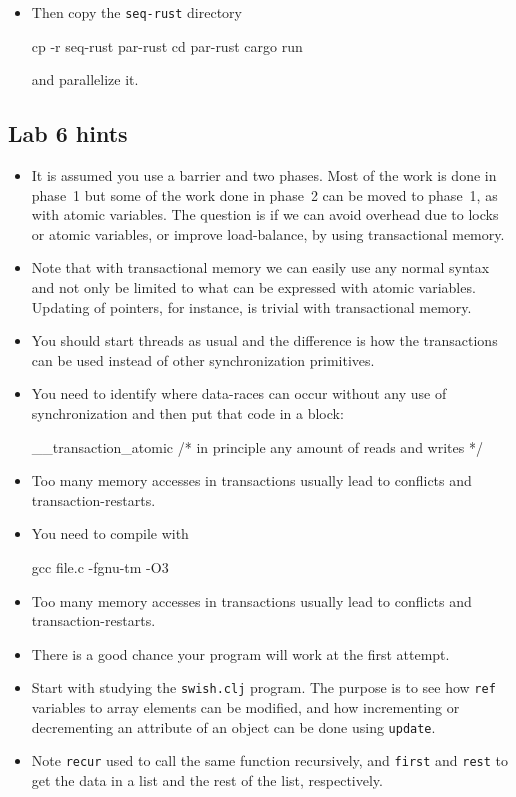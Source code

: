 \documentclass{forsete}
\begin{document}
{\begin{itemize}
\item Then copy the \verb.seq-rust. directory
\begin{ccode}
cp -r seq-rust par-rust
cd par-rust
cargo run
\end{ccode}
and parallelize it.

\end{itemize}

\subsection*{Lab 6 hints}
\begin{itemize}
\item It is assumed you use a barrier and two phases. Most of the work is done in phase~1 but some 
of the work done in phase~2 can be moved to phase~1, as with atomic variables. The question is
if we can avoid overhead due to locks or atomic variables, or improve load-balance, by using transactional memory.
\item Note that with transactional memory we can easily use any normal syntax and not only 
be limited to what can be expressed with atomic variables. Updating of pointers, for instance, is 
trivial with transactional memory.
\item You should start threads as usual and the difference is how the transactions can be used
instead of other synchronization primitives. 
\item You need to identify where data-races can occur without any use of synchronization and then
put that code in a block:
\begin{ccode}
__transaction_atomic {
	/* in principle any amount of reads and writes */
}
\end{ccode}
\item Too many memory accesses in transactions usually lead to conflicts and transaction-restarts.
\item You need to compile with
\begin{ccode}
gcc file.c -fgnu-tm -O3
\end{ccode}
\item Too many memory accesses in transactions usually lead to conflicts and transaction-restarts.
\item There is a good chance your program will work at the first attempt.

\item Start with studying the \verb!swish.clj! program. The purpose is to see how \verb.ref. variables
to array elements can be modified, and how incrementing or decrementing an attribute of an
object can be done using \verb!update!.
\item Note \verb.recur. used to call the same function recursively, and \verb!first! and \verb!rest!
to get the data in a list and the rest of the list, respectively.


\end{itemize}}
\end{document}
